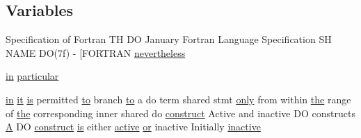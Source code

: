 \subsection*{Variables}
\begin{DoxyCompactItemize}
\item 
Specification of Fortran TH DO January Fortran Language Specification SH N\+A\+ME DO(7f) -\/ \mbox{[}\+F\+O\+R\+T\+R\+AN \hyperlink{do_87_8txt_ab7258a51438c0e5ab53918c2e80ad857}{nevertheless}
\item 
\hyperlink{M__journal_83_8txt_afce72651d1eed785a2132bee863b2f38}{in} \hyperlink{do_87_8txt_aae36f036c0d7b1178771b2e41ac8070a}{particular}
\item 
\hyperlink{M__journal_83_8txt_afce72651d1eed785a2132bee863b2f38}{in} \hyperlink{what__overview_81_8txt_ada5182f077041a6bc59b37d2cefe9b09}{it} \hyperlink{intro__blas1_83_8txt_a42a91df93f840595de3019ceb5d1df23}{is} permitted \hyperlink{M__stopwatch_83_8txt_a97209fd3e34ef701c0a9734280779cbb}{to} branch \hyperlink{M__stopwatch_83_8txt_a97209fd3e34ef701c0a9734280779cbb}{to} a do term shared stmt \hyperlink{M__time_83_8txt_a944d4b6c63c2e981d8b0d36199afdfdd}{only} from within \hyperlink{M__stopwatch_83_8txt_a0f266597de2e57eb3aa964927bb30e14}{the} range of \hyperlink{M__stopwatch_83_8txt_a0f266597de2e57eb3aa964927bb30e14}{the} corresponding inner shared do \hyperlink{exit_87_8txt_aa7ebb4c04e8aa413d646a62e1f67fb5c}{construct} Active and inactive DO constructs \hyperlink{ufpp__overview_81_8txt_a316dd9734f0d687136b27cb10311ed5d}{A} DO \hyperlink{exit_87_8txt_aa7ebb4c04e8aa413d646a62e1f67fb5c}{construct} \hyperlink{intro__blas1_83_8txt_a42a91df93f840595de3019ceb5d1df23}{is} either \hyperlink{do_87_8txt_a3300b8e9ebbb88612226328b1b2fd93f}{active} \hyperlink{what__overview_81_8txt_a08ee81dca94cf4ba88d4a64051e232d5}{or} inactive Initially \hyperlink{do_87_8txt_a510b16c990ba8c721e7968e80da73f30}{inactive}
\item 

\end{DoxyCompactItemize}
